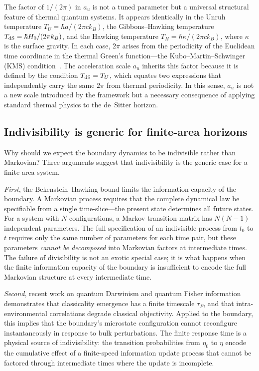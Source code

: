 \documentclass[aps,prd,twocolumn,superscriptaddress,nofootinbib]{revtex4-2}
\begin{document}
The factor of $1/(2\pi)$ in $a_u$ is not a tuned parameter but a universal structural feature of thermal quantum systems. It appears identically in the Unruh temperature $T_U = \hbar a/(2\pi c k_B)$, the Gibbons--Hawking temperature $T_{\rm dS} = \hbar H_0/(2\pi k_B)$, and the Hawking temperature $T_H = \hbar \kappa/(2\pi c k_B)$, where $\kappa$ is the surface gravity. In each case, $2\pi$ arises from the periodicity of the Euclidean time coordinate in the thermal Green's function---the Kubo--Martin--Schwinger (KMS) condition~\cite{Kubo1966}. The acceleration scale $a_u$ inherits this factor because it is defined by the condition $T_{\rm dS} = T_U$, which equates two expressions that independently carry the same $2\pi$ from thermal periodicity. In this sense, $a_u$ is not a new scale introduced by the framework but a necessary consequence of applying standard thermal physics to the de~Sitter horizon.

\subsection{Indivisibility is generic for finite-area horizons}

Why should we expect the boundary dynamics to be indivisible rather than Markovian? Three arguments suggest that indivisibility is the generic case for a finite-area system.

\emph{First}, the Bekenstein--Hawking bound limits the information capacity of the boundary. A Markovian process requires that the complete dynamical law be specifiable from a single time-slice---the present state determines all future states. For a system with $N$ configurations, a Markov transition matrix has $N(N-1)$ independent parameters. The full specification of an indivisible process from $t_0$ to $t$ requires only the same number of parameters for each time pair, but these parameters \emph{cannot be decomposed} into Markovian factors at intermediate times. The failure of divisibility is not an exotic special case; it is what happens when the finite information capacity of the boundary is insufficient to encode the full Markovian structure at every intermediate time.

\emph{Second}, recent work on quantum Darwinism and quantum Fisher information~\cite{Kiely2025} demonstrates that classicality emergence has a finite timescale $\tau_F$, and that intra-environmental correlations degrade classical objectivity. Applied to the boundary, this implies that the boundary's microstate configuration cannot reconfigure instantaneously in response to bulk perturbations. The finite response time is a physical source of indivisibility: the transition probabilities from $\eta_0$ to $\eta$ encode the cumulative effect of a finite-speed information update process that cannot be factored through intermediate times where the update is incomplete.
\end{document}
